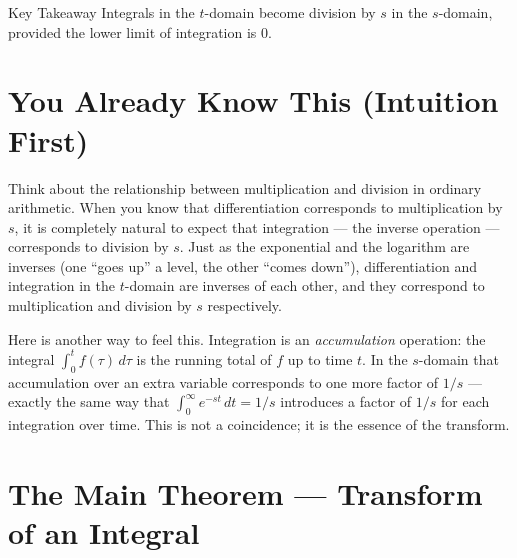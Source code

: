\documentclass[12pt,a4paper]{article}
\begin{document}
\begin{learnbox}{Key Takeaway}
Integrals in the $t$-domain become division by $s$ in the $s$-domain, provided the
lower limit of integration is $0$.
\end{learnbox}

\section{You Already Know This (Intuition First)}

Think about the relationship between multiplication and division in ordinary arithmetic.
When you know that differentiation corresponds to multiplication by $s$, it is completely
natural to expect that integration --- the inverse operation --- corresponds to division
by $s$. Just as the exponential and the logarithm are inverses (one ``goes up'' a level,
the other ``comes down''), differentiation and integration in the $t$-domain are inverses
of each other, and they correspond to multiplication and division by $s$ respectively.

Here is another way to feel this. Integration is an \emph{accumulation} operation: the
integral $\int_0^t f(\tau)\,d\tau$ is the running total of $f$ up to time $t$. In the
$s$-domain that accumulation over an extra variable corresponds to one more factor of
$1/s$ --- exactly the same way that $\int_0^\infty e^{-st}\,dt = 1/s$ introduces a factor
of $1/s$ for each integration over time. This is not a coincidence; it is the essence
of the transform.

\section{The Main Theorem --- Transform of an Integral}
\end{document}
